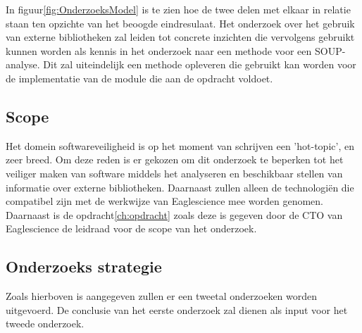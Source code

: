 In figuur\ref{fig:OnderzoeksModel} is te zien hoe de twee delen met elkaar in relatie staan ten opzichte van het beoogde eindresulaat. Het onderzoek over het gebruik van externe bibliotheken zal leiden tot concrete inzichten die vervolgens gebruikt kunnen worden als kennis in het onderzoek naar een methode voor een SOUP-analyse. Dit zal uiteindelijk een methode opleveren die gebruikt kan worden voor de implementatie van de module die aan de opdracht voldoet.

\subsection{Scope}\label{subsec:scope}
Het domein softwareveiligheid is op het moment van schrijven een 'hot-topic', en zeer breed. Om deze reden is er gekozen om dit onderzoek te beperken tot het veiliger maken van software middels het analyseren en beschikbaar stellen van informatie over externe bibliotheken. Daarnaast zullen alleen de technologiën die compatibel zijn met de werkwijze van Eaglescience mee worden genomen. Daarnaast is de opdracht\ref{ch:opdracht} zoals deze is gegeven door de CTO van Eaglescience de leidraad voor de scope van het onderzoek.

\subsection{Onderzoeks strategie}\label{subsec:onderzoeks-strategie}
Zoals hierboven is aangegeven zullen er een tweetal onderzoeken worden uitgevoerd. De conclusie van het eerste onderzoek zal dienen als input voor het tweede onderzoek.



